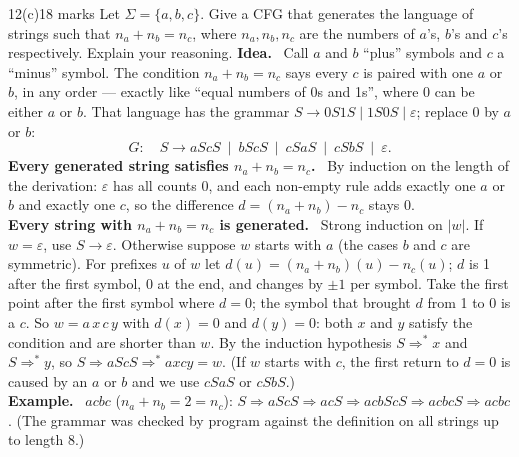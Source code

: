 \documentclass[10.5pt,a4paper]{article}
\newcommand{\ansh}[1]{\textbf{\color{exborder}#1}\ }
\newcommand{\eps}{\varepsilon}
\begin{document}
\begin{qa}{12(c)}{18 marks}
Let $\Sigma=\{a,b,c\}$. Give a CFG that generates the language of strings such that $n_a+n_b=n_c$, where $n_a,n_b,n_c$ are the numbers of $a$'s, $b$'s
and $c$'s respectively. Explain your reasoning.
\tcblower
\ansh{Idea.} Call $a$ and $b$ ``plus'' symbols and $c$ a ``minus'' symbol. The condition $n_a+n_b=n_c$ says every $c$ is paired with one $a$ or $b$,
in any order --- exactly like ``equal numbers of 0s and 1s'', where 0 can be either $a$ or $b$. That language has the grammar
$S\to0S1S\mid1S0S\mid\eps$; replace 0 by $a$ or $b$:
\[G:\quad S\to aScS\ \mid\ bScS\ \mid\ cSaS\ \mid\ cSbS\ \mid\ \eps .\]
\ansh{Every generated string satisfies $n_a+n_b=n_c$.} By induction on the length of the derivation: $\eps$ has all counts 0, and each non-empty
rule adds exactly one $a$ or $b$ and exactly one $c$, so the difference $d=(n_a+n_b)-n_c$ stays 0.\\
\ansh{Every string with $n_a+n_b=n_c$ is generated.} Strong induction on $|w|$. If $w=\eps$, use $S\to\eps$. Otherwise suppose $w$ starts with $a$
(the cases $b$ and $c$ are symmetric). For prefixes $u$ of $w$ let $d(u)=(n_a+n_b)(u)-n_c(u)$; $d$ is 1 after the first symbol, 0 at the end, and
changes by $\pm1$ per symbol. Take the first point after the first symbol where $d=0$; the symbol that brought $d$ from 1 to 0 is a $c$. So
$w=a\,x\,c\,y$ with $d(x)=0$ and $d(y)=0$: both $x$ and $y$ satisfy the condition and are shorter than $w$. By the induction hypothesis
$S\Rightarrow^*x$ and $S\Rightarrow^*y$, so $S\Rightarrow aScS\Rightarrow^*axcy=w$. (If $w$ starts with $c$, the first return to $d=0$ is caused by an $a$ or $b$
and we use $cSaS$ or $cSbS$.)\\
\ansh{Example.} $acbc$ ($n_a+n_b=2=n_c$): $S\Rightarrow aScS\Rightarrow acS\Rightarrow acbScS\Rightarrow acbcS\Rightarrow acbc$.
(The grammar was checked by program against the definition on all strings up to length 8.)
\end{qa}
\end{document}
